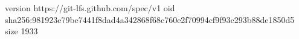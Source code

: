 version https://git-lfs.github.com/spec/v1
oid sha256:981923e79be7441f8dad4a342868f68c760e2f70994cf9f93c293b88de1850d5
size 1933
